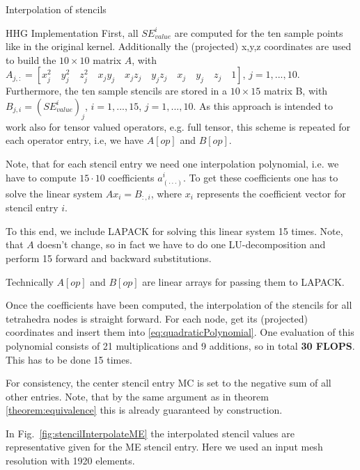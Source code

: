 \documentclass[a4paper,11pt,reqno]{amsart}
\numberwithin{figure}{section}
\numberwithin{table}{section}
\numberwithin{figure}{section}
\def\si{SE_{value}^i}
\begin{document}
\begin{section}{Interpolation of stencils}
\begin{subsection}{HHG Implementation}
First, all $\si$ are computed for the ten sample points like in the original kernel. 
Additionally the (projected) x,y,z coordinates are used to build the $10\times10$ 
matrix $A$, with 
$A_{j,:} = \left[x_j^2\quad y_j^2\quad z_j^2\quad x_jy_j\quad x_jz_j\quad y_jz_j\quad
x_j\quad y_j\quad z_j\quad 1\right]$, $j = 1,...,10$.
Furthermore, the ten sample stencils are stored in a $10\times15$ matrix B,
with $B_{j,i} = \left(\si\right)_j$, $i = 1,...,15$, $j=1,...,10$. 
As this approach is intended to work 
also for tensor valued operators, e.g. full tensor, this scheme is repeated for each
operator entry, i.e, we have $A[op]$ and $B[op]$.

Note, that for each stencil entry we need one interpolation polynomial, i.e. we
have to compute $15\cdot10$ coefficients $a_{(\cdot\cdot\cdot)}^i$. To get these
coefficients one has to solve the linear system $Ax_i = B_{:,i}$,
where $x_i$ represents the coefficient vector for stencil entry $i$.

To this end, we include LAPACK for solving this linear system 15 times. 
Note, that $A$ doesn't change, so in fact we have to do one LU-decomposition
and perform 15 forward and backward substitutions.

Technically $A[op]$ and $B[op]$ are linear arrays for passing them to LAPACK. 

Once the coefficients have been computed, the interpolation of the stencils for
all tetrahedra nodes is straight forward. For each node, get its (projected) coordinates
and insert them into \eqref{eq:quadraticPolynomial}. One evaluation
of this polynomial consists of 21 multiplications and 9 additions, so in total 
\textbf{30 FLOPS}. This has to be done 15 times. 

For consistency, the center stencil
entry MC is set to the negative sum of all other entries.
Note, that by the same argument as in theorem \ref{theorem:equivalence}
this is already guaranteed by construction.

In Fig.~\ref{fig:stencilInterpolateME} the interpolated stencil values are representative
given for the ME stencil entry. Here we used an input mesh resolution with 1920 elements.



\end{subsection}
\end{section}
\end{document}
